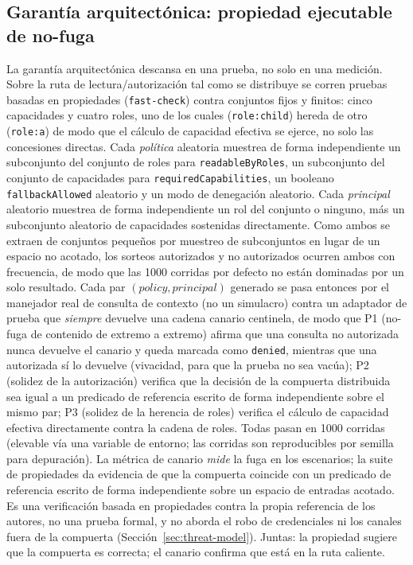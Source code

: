 \documentclass[conference,letterpaper]{IEEEtran}
\begin{document}
\subsection{Garant\'ia arquitect\'onica: propiedad ejecutable de no-fuga}
La garant\'ia arquitect\'onica descansa en una prueba, no solo en una medici\'on. Sobre la ruta de
lectura/autorizaci\'on tal como se distribuye se corren pruebas basadas en propiedades
(\texttt{fast-check}) contra conjuntos fijos y finitos: cinco capacidades y cuatro roles, uno de los
cuales (\texttt{role:child}) hereda de otro (\texttt{role:a}) de modo que el c\'alculo de capacidad
efectiva se ejerce, no solo las concesiones directas. Cada \emph{pol\'itica} aleatoria muestrea de
forma independiente un subconjunto del conjunto de roles para \texttt{readableByRoles}, un
subconjunto del conjunto de capacidades para \texttt{requiredCapabilities}, un booleano
\texttt{fallbackAllowed} aleatorio y un modo de denegaci\'on aleatorio. Cada \emph{principal}
aleatorio muestrea de forma independiente un rol del conjunto o ninguno, m\'as un subconjunto
aleatorio de capacidades sostenidas directamente. Como ambos se extraen de conjuntos peque\~nos por
muestreo de subconjuntos en lugar de un espacio no acotado, los sorteos autorizados y no autorizados
ocurren ambos con frecuencia, de modo que las 1000 corridas por defecto no est\'an dominadas por un
solo resultado. Cada par $(policy,principal)$ generado se pasa entonces por el manejador real de
consulta de contexto (no un simulacro) contra un adaptador de prueba que \emph{siempre} devuelve una
cadena canario centinela, de modo que P1 (no-fuga de contenido de extremo a extremo) afirma que una
consulta no autorizada nunca devuelve el canario y queda marcada como \texttt{denied}, mientras que
una autorizada s\'i lo devuelve (vivacidad, para que la prueba no sea vac\'ua); P2 (solidez de la
autorizaci\'on) verifica que la decisi\'on de la compuerta distribuida sea igual a un predicado de
referencia escrito de forma independiente sobre el mismo par; P3 (solidez de la herencia de roles)
verifica el c\'alculo de capacidad efectiva directamente contra la cadena de roles. Todas pasan en
1000 corridas (elevable v\'ia una variable de entorno; las corridas son reproducibles por semilla para
depuraci\'on). La m\'etrica de canario \emph{mide} la fuga en los escenarios; la suite de propiedades da evidencia de que la compuerta coincide con un predicado de referencia escrito de forma independiente sobre un espacio de entradas acotado. Es una verificación basada en propiedades contra la propia referencia de los autores, no una prueba formal, y no aborda el robo de credenciales ni los canales fuera de la compuerta (Sección~\ref{sec:threat-model}). Juntas: la propiedad sugiere que la compuerta es correcta; el canario confirma que está en la ruta caliente.
\end{document}
